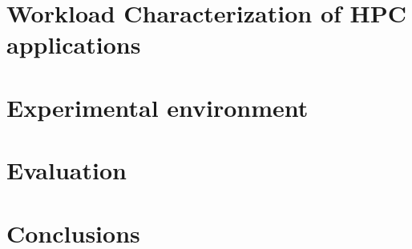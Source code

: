 \documentclass[format=sigconf, review=false, anonymous=false]{acmart}
\begin{document}
\section{Workload Characterization of HPC applications}
\label{sec:workload}
  

\section{Experimental environment}
\label{sec:Experimental}


\section{Evaluation}
\label{sec:evaluation}


% 

\section{Conclusions}
\label{sec:Conclusions}
 




\balance
%

%
%
%
%
 
\end{document}
